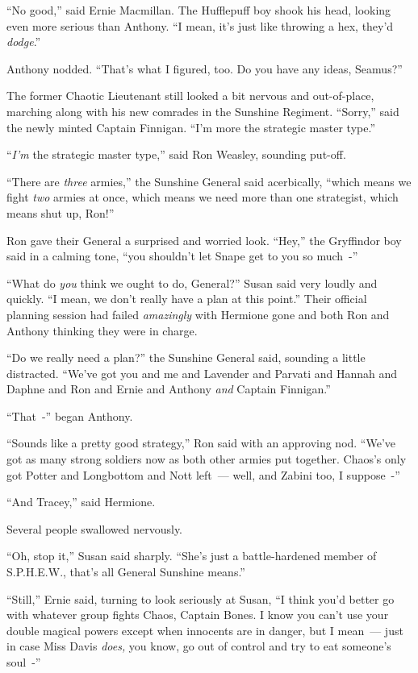 ``No good,'' said Ernie Macmillan. The Hufflepuff boy shook his head, looking even more serious than Anthony. ``I mean, it's just like throwing a hex, they'd \emph{dodge}.''

Anthony nodded. ``That's what I figured, too. Do you have any ideas, Seamus?''

The former Chaotic Lieutenant still looked a bit nervous and out-of-place, marching along with his new comrades in the Sunshine Regiment. ``Sorry,'' said the newly minted Captain Finnigan. ``I'm more the strategic master type.''

``\emph{I'm} the strategic master type,'' said Ron Weasley, sounding put-off.

``There are \emph{three} armies,'' the Sunshine General said acerbically, ``which means we fight \emph{two} armies at once, which means we need more than one strategist, which means shut up, Ron!''

Ron gave their General a surprised and worried look. ``Hey,'' the Gryffindor boy said in a calming tone, ``you shouldn't let Snape get to you so much~-''

``What do \emph{you} think we ought to do, General?'' Susan said very loudly and quickly. ``I mean, we don't really have a plan at this point.'' Their official planning session had failed \emph{amazingly} with Hermione gone and both Ron and Anthony thinking they were in charge.

``Do we really need a plan?'' the Sunshine General said, sounding a little distracted. ``We've got you and me and Lavender and Parvati and Hannah and Daphne and Ron and Ernie and Anthony \emph{and} Captain Finnigan.''

``That~-'' began Anthony.

``Sounds like a pretty good strategy,'' Ron said with an approving nod. ``We've got as many strong soldiers now as both other armies put together. Chaos's only got Potter and Longbottom and Nott left~--- well, and Zabini too, I suppose~-''

``And Tracey,'' said Hermione.

Several people swallowed nervously.

``Oh, stop it,'' Susan said sharply. ``She's just a battle-hardened member of S.P.H.E.W., that's all General Sunshine means.''

``Still,'' Ernie said, turning to look seriously at Susan, ``I think you'd better go with whatever group fights Chaos, Captain Bones. I know you can't use your double magical powers except when innocents are in danger, but I mean~--- just in case Miss Davis \emph{does,} you know, go out of control and try to eat someone's soul~-''

